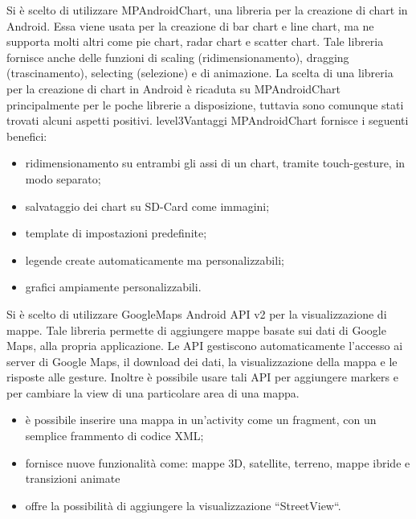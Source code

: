 Si è scelto di utilizzare MPAndroidChart, una libreria per la creazione di chart in Android. Essa viene usata per la creazione di bar chart e line chart, ma ne supporta molti altri come pie chart, radar chart e scatter chart. Tale libreria fornisce anche delle funzioni di scaling (ridimensionamento), dragging (trascinamento), selecting (selezione) e di animazione. La scelta di una libreria per la creazione di chart in Android è ricaduta su MPAndroidChart principalmente per le poche librerie a disposizione, tuttavia sono comunque stati trovati alcuni aspetti positivi.
level{3}{Vantaggi}
MPAndroidChart fornisce i seguenti benefici:
\begin{itemize}
\item ridimensionamento su entrambi gli assi di un chart, tramite touch-gesture, in modo separato;
\item salvataggio dei chart su SD-Card come immagini;
\item template di impostazioni predefinite;
\item legende create automaticamente ma personalizzabili;
\item grafici ampiamente personalizzabili.
\end{itemize}

Si è scelto di utilizzare GoogleMaps Android API v2 per la visualizzazione di mappe. Tale libreria permette di aggiungere mappe basate sui dati di Google Maps, alla propria applicazione. Le API gestiscono automaticamente l'accesso ai server di Google Maps, il download dei dati, la visualizzazione della mappa e le risposte alle gesture. Inoltre è possibile usare tali API per aggiungere markers e per cambiare la view di una particolare area di una mappa.
\begin{itemize}
\item è possibile inserire una mappa in un'activity come un fragment, con un semplice frammento di codice XML;
\item fornisce nuove funzionalità come: mappe 3D, satellite, terreno, mappe ibride e transizioni animate
\item offre la possibilità di aggiungere la visualizzazione “StreetView“.
\end{itemize}